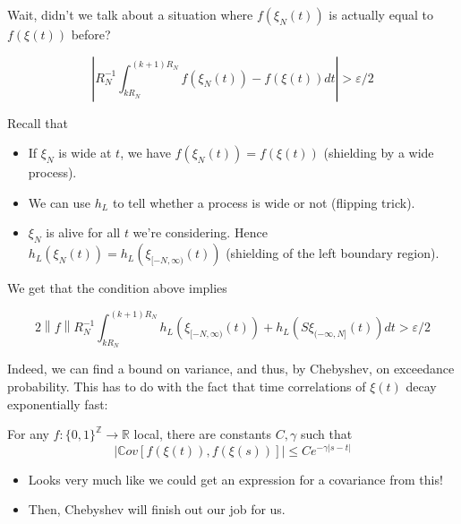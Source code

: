 \documentclass{beamer}
\newcommand{\norm}[1]{{\left\lVert#1\right\rVert}}
\begin{document}
\begin{frame}
    Wait, didn't we talk about a situation where $f(\xi_N(t))$ is actually equal to $f(\xi(t))$ before?

    \[
        \left|R_N^{-1}\int_{kR_N}^{(k+1)R_N}f(\xi_N(t)) - f(\xi(t))dt \right| > \varepsilon/2 
    \]

    Recall that 
    \begin{itemize}
        \item If $\xi_N$ is wide at $t$, we have $f(\xi_N(t)) = f(\xi(t))$ (shielding by a wide process). 
        \item We can use $h_L$ to tell whether a process is wide or not (flipping trick).
        \item $\xi_N$ is alive for all $t$ we're considering. Hence $h_L(\xi_N(t)) = h_L(\xi_{[-N,\infty)}(t))$ (shielding of the left boundary region).
    \end{itemize}
    We get that the condition above implies

    \[
        2\norm{f}R_N^{-1}\int_{kR_N}^{(k+1)R_N}h_L(\xi_{[-N, \infty)}(t)) + h_L(S\xi_{(-\infty, N]}(t))dt > \varepsilon/2
    \]
\end{frame}

\begin{frame}
    Indeed, we can find a bound on variance, and thus, by Chebyshev, on exceedance probability. This has to do with the fact that time correlations of $\xi(t)$ decay exponentially fast:
    \begin{theorem}
        For any $f : \{0,1\}^\mathbb{Z}\rightarrow \mathbb{R}$ local, there are constants $C, \gamma$ such that 
        \[
            \left|\mathbb{C}ov\left[ f(\xi(t)), f(\xi(s))\right]\right| \leq Ce^{-\gamma|s-t|}
        \]
    \end{theorem}
    \begin{itemize}
        \item<3-> Looks very much like we could get an expression for a covariance from this! 
        \item<4-> Then, Chebyshev will finish out our job for us.
    \end{itemize}
\end{frame}
\end{document}
